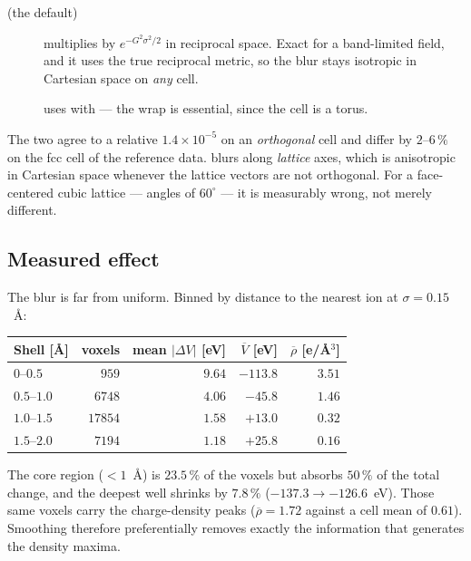 \begin{description}
  \item[ (the default)] multiplies by $e^{-G^2\sigma^2/2}$ in
    reciprocal space. Exact for a band-limited field, and it uses the true
    reciprocal metric, so the blur stays isotropic in Cartesian space on
    \emph{any} cell.
  \item[] uses  with
     --- the wrap is essential, since the cell is a torus.
\end{description}

\begin{pwarn}
The two agree to a relative $1.4\times10^{-5}$ on an \emph{orthogonal} cell and
differ by $2$--$6\,\%$ on the fcc cell of the reference data. 
blurs along \emph{lattice} axes, which is anisotropic in Cartesian space
whenever the lattice vectors are not orthogonal. For a face-centered cubic
lattice --- angles of $60^\circ$ --- it is measurably wrong, not merely
different.
\end{pwarn}

\subsection{Measured effect}

The blur is far from uniform. Binned by distance to the nearest ion at
$\sigma = 0.15$~\AA:

\begin{center}
\begin{tabular}{@{}lrrrr@{}}
\toprule
Shell [\AA] & voxels & mean $|\Delta V|$ [eV] & $\overline{V}$ [eV] & $\overline{\rho}$ [e/\AA$^3$] \\
\midrule
$0$--$0.5$ & $959$ & $9.64$ & $-113.8$ & $3.51$ \\
$0.5$--$1.0$ & $6748$ & $4.06$ & $-45.8$ & $1.46$ \\
$1.0$--$1.5$ & $17854$ & $1.58$ & $+13.0$ & $0.32$ \\
$1.5$--$2.0$ & $7194$ & $1.18$ & $+25.8$ & $0.16$ \\
\bottomrule
\end{tabular}
\end{center}

The core region ($< 1$~\AA) is $23.5\,\%$ of the voxels but absorbs
$50\,\%$ of the total change, and the deepest well shrinks by $7.8\,\%$
($-137.3 \to -126.6$~eV). Those same voxels carry the charge-density peaks
($\overline\rho = 1.72$ against a cell mean of $0.61$). Smoothing therefore
preferentially removes exactly the information that generates the density
maxima.

